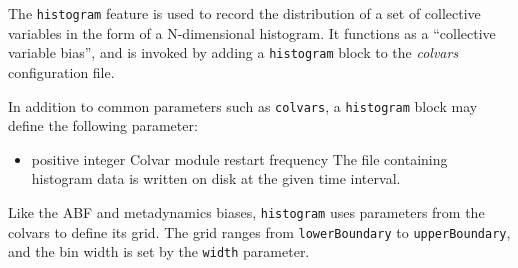The \texttt{histogram} feature is used to record the distribution of a set of collective
variables in the form of a N-dimensional histogram.
It functions as a ``collective variable bias'', and is invoked by adding a
\texttt{histogram} block to the \textit{colvars} configuration file.

In addition to common parameters such as \texttt{colvars}, a
\texttt{histogram} block may define the following parameter:

\begin{itemize}
\item {}
  {positive integer}
  {Colvar module restart frequency}
  {The file containing histogram data is written on disk at the given time interval.}
\end{itemize}

Like the ABF and metadynamics biases, \texttt{histogram} uses
parameters from the colvars to define its grid.  The grid ranges from
\texttt{lowerBoundary} to \texttt{upperBoundary}, and the bin width is
set by the \texttt{width} parameter.

